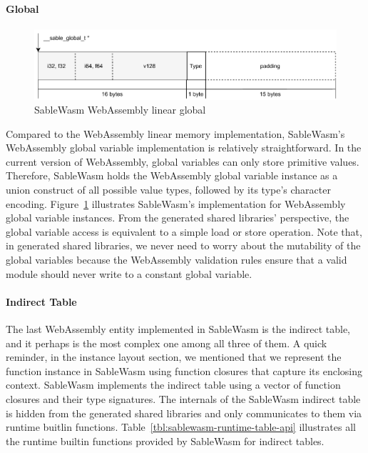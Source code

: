 \paragraph{Global}

\begin{figure}
    \centering
    \includegraphics[width=\textwidth]{Images/5.Backend and Runtime/global}
    \caption{SableWasm WebAssembly linear global}
    \label{fig:backend-global}
\end{figure}

Compared to the WebAssembly linear memory implementation, SableWasm's
WebAssembly global variable implementation is relatively straightforward. In
the current version of WebAssembly, global variables can only store primitive
values. Therefore, SableWasm holds the WebAssembly global variable instance as
a union construct of all possible value types, followed by its type's character
encoding. Figure~\ref{fig:backend-global} illustrates SableWasm's implementation
for WebAssembly global variable instances. From the generated shared libraries'
perspective, the global variable access is equivalent to a simple load or store
operation. Note that, in generated shared libraries, we never need to worry
about the mutability of the global variables because the WebAssembly validation
rules ensure that a valid module should never write to a constant global
variable.

\paragraph{Indirect Table}
The last WebAssembly entity implemented in SableWasm is the indirect table, and
it perhaps is the most complex one among all three of them. A quick reminder,
in the instance layout section, we mentioned that we represent the function
instance in SableWasm using function closures that capture its enclosing
context. SableWasm implements the indirect table using a vector of function
closures and their type signatures. The internals of the SableWasm indirect
table is hidden from the generated shared libraries and only communicates to
them via runtime buitlin functions. Table~\ref{tbl:sablewasm-runtime-table-api}
illustrates all the runtime builtin functions provided by SableWasm for
indirect tables.

